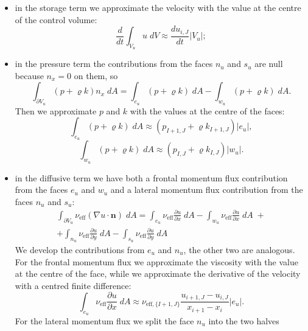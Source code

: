 \begin{itemize}
	\item in the storage term we approximate the velocity with the value at the 
	centre of the control volume:
	\begin{equation}
	\frac{d}{dt} \int_{V_u}  u\; dV \approx \frac{du_{i,J}}{dt}|V_u|;
	\end{equation}
	\item in the pressure term the contributions from the faces $n_u$ and $s_u$ 
	are null because $n_x=0$ on them, so 
	\begin{equation}
	\int_{\partial V_u} (p + \varrho k)n_x \; dA = \int_{e_u} (p+\varrho k) \; 
	dA - \int_{w_u} (p+\varrho k) \; dA.
	\end{equation}
	Then we approximate $p$ and $k$ with the values at the centre of the faces:
	\begin{equation}
	\int_{e_u} (p+\varrho k) \; dA \approx (p_{I+1,J} +\varrho k_{I+1,J}) |e_u|,
	\end{equation}
	\begin{equation}
	\int_{w_u} (p+\varrho k) \; dA \approx (p_{I,J} +\varrho k_{I,J}) |w_u|.
	\end{equation}
	\item in the diffusive term we have both a frontal momentum flux 
	contribution from the faces $e_u$ and $w_u$ and a lateral momentum flux 
	contribution from the faces $n_u$ and $s_u$:
	\begin{multline}
	\int_{\partial V_u} \nu_\text{eff} (\nabla u \cdot \mathbf{n}) \; dA =     
	\int_{e_u} \nu_\text{eff} \frac{\partial u}{\partial x} \; dA
	- \int_{w_u} \nu_\text{eff} \frac{\partial u}{\partial x} \; dA \;+\\
	+\int_{n_u} \nu_\text{eff} \frac{\partial u}{\partial y} \; dA
	- \int_{s_u} \nu_\text{eff} \frac{\partial u}{\partial y} \; dA
	\end{multline}
	We develop the contributions from $e_u$ and $n_u$, the other two are 
	analogous.\\	
	For the frontal momentum flux we approximate the viscosity with 
	the value at the centre of the face, while we approximate the derivative of 
	the velocity with a centred finite difference:
	\begin{equation}
	\int_{e_u} \nu_\text{eff} \frac{\partial u}{\partial x} \; dA \approx 
	\nu_{\text{eff},\{I+1,J\}} \frac{u_{i+1,J} - u_{i,J}}{x_{i+1}-x_i} |e_u|.
	\end{equation}
	For the lateral momentum flux we split the 	face $n_u$ into the two halves 

\end{itemize}
